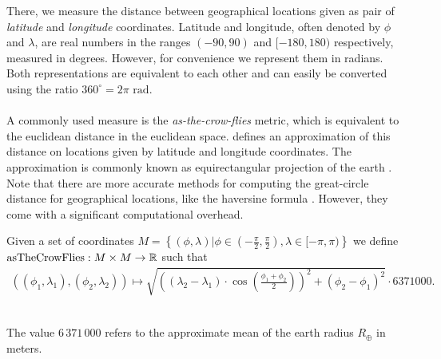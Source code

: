 	There, we measure the distance between geographical locations given as pair of \textit{latitude} and \textit{longitude} coordinates.
	Latitude and longitude, often denoted by $\phi$ and $\lambda$, are real numbers in the ranges $(-90, 90)$ and $[-180, 180)$ respectively,
	measured in degrees. However, for convenience we represent them in radians. Both representations are equivalent to each other
	and can easily be converted using the ratio $360^\circ = 2 \pi \text{ rad}$.\\\\
	A commonly used measure is the \textit{as-the-crow-flies} metric, which is equivalent to the euclidean distance in the euclidean space.
	 defines an approximation of this distance on locations given by latitude and longitude coordinates.
	The approximation is commonly known as equirectangular projection of the earth .
	Note that there are more accurate methods for computing the great-circle distance for geographical locations,
	like the haversine formula . However, they come with a significant computational overhead.
	\begin{mydef}\label{asTheCrowFlies}
		Given a set of coordinates $M = \left\{(\phi, \lambda) | \phi \in \left(-\frac{\pi}{2}, \frac{\pi}{2}\right), \lambda \in [-\pi, \pi)\right\}$ we define
		$\operatorname{asTheCrowFlies}: M \times M \to \mathbb{R}$ such that
		\begin{align*}
			\left(\left(\phi_1, \lambda_1\right), \left(\phi_2, \lambda_2\right)\right) \mapsto
				\sqrt{\left(\left(\lambda_2 - \lambda_1\right) \cdot \cos\left(\frac{\phi_1 + \phi_2}{2}\right)\right)^2
					+ \left(\phi_2 - \phi_1\right)^2} \cdot 6371000.
		\end{align*}
	\end{mydef}\quad\\
	The value $6\,371\,000$ refers to the approximate mean of the earth radius $R_{\oplus}$ in meters.